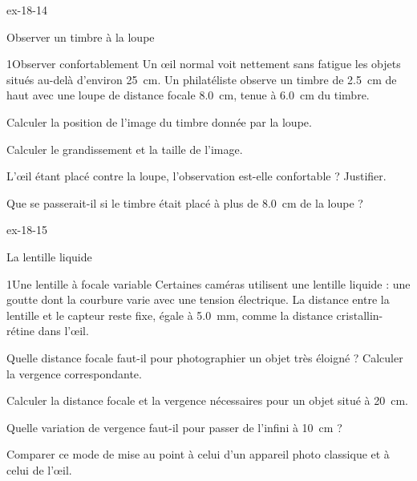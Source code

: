 \begin{blocLivre}{ex-18-14}
\begin{exercice}[3]{Observer un timbre à la loupe}
\begin{docu}{1}{Observer confortablement}
Un œil normal voit nettement sans fatigue les objets situés au-delà d'environ \qty{25}{cm}. Un philatéliste observe un timbre de \qty{2,5}{cm} de haut
avec une loupe de distance focale \qty{8,0}{cm}, tenue à \qty{6,0}{cm} du timbre.
\end{docu}
\begin{questions}
\item Calculer la position de l'image du timbre donnée par la loupe.
\item Calculer le grandissement et la taille de l'image.
\item L'œil étant placé contre la loupe, l'observation est-elle confortable ? Justifier.
\item \initiative Que se passerait-il si le timbre était placé à plus de \qty{8,0}{cm} de la loupe ?
\end{questions}
\end{exercice}
\end{blocLivre}
\begin{blocLivre}{ex-18-15}
\begin{exercice}[3]{La lentille liquide}
\begin{docu}{1}{Une lentille à focale variable}
Certaines caméras utilisent une lentille liquide : une goutte dont la courbure varie avec une tension électrique. La distance entre la
lentille et le capteur reste fixe, égale à \qty{5,0}{mm}, comme la distance cristallin-rétine dans l'œil.
\end{docu}
\begin{questions}
\item Quelle distance focale faut-il pour photographier un objet très éloigné ? Calculer la vergence correspondante.
\item Calculer la distance focale et la vergence nécessaires pour un objet situé à \qty{20}{cm}.
\item \initiative Quelle variation de vergence faut-il pour passer de l'infini à \qty{10}{cm} ?
\item Comparer ce mode de mise au point à celui d'un appareil photo classique et à celui de l'œil.
\end{questions}
\end{exercice}
\end{blocLivre}

